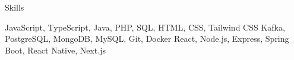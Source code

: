 
\begin{rubric}{Skills}

	JavaScript, TypeScript, Java, PHP, SQL, HTML, CSS, Tailwind CSS
\entry*[Tools]
	Kafka, PostgreSQL, MongoDB, MySQL, Git, Docker
	  React, Node.js, Express, Spring Boot, React Native, Next.js
\end{rubric}